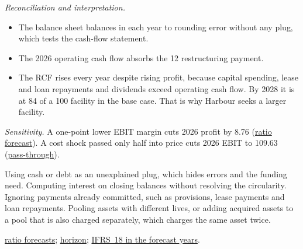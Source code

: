 \begin{qfexample}
\emph{Reconciliation and interpretation.}
\begin{itemize}
\item The balance sheet balances in each year to rounding error without any plug, which tests the cash-flow statement.
\item The 2026 operating cash flow absorbs the 12 restructuring payment.
\item The RCF rises every year despite rising profit, because capital spending, lease and loan repayments and dividends exceed operating cash flow. By 2028 it is at 84 of a 100 facility in the base case. That is why Harbour seeks a larger facility.
\end{itemize}

\emph{Sensitivity.} A one-point lower EBIT margin cuts 2026 profit by 8.76 (\hyperref[meth:ratio-based-earnings-forecast]{ratio forecast}). A cost shock passed only half into price cuts 2026 EBIT to 109.63 (\hyperref[meth:competition-inflation-forecasting]{pass-through}).

 Using cash or debt as an unexplained plug, which hides errors and the funding need. Computing interest on closing balances without resolving the circularity. Ignoring payments already committed, such as provisions, lease payments and loan repayments. Pooling assets with different lives, or adding acquired assets to a pool that is also charged separately, which charges the same asset twice.

 \hyperref[meth:ratio-based-earnings-forecast]{ratio forecasts}; \hyperref[meth:forecast-horizon-steady-state]{horizon}; \hyperref[meth:accounting-change-effects]{IFRS~18 in the forecast years}.

\end{qfexample}

